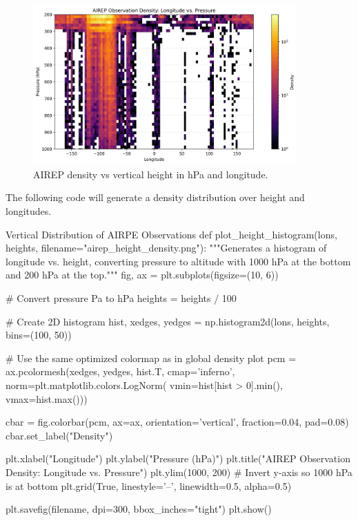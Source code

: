 \begin{figure}[ht]
    \centering
    \includegraphics[width=0.9\textwidth]{images/airep_height_density.png}
    \caption{AIREP density vs vertical height in hPa and longitude.}
    \label{fig:airep_plot}
\end{figure}

The following code will generate a density distribution over height and longitudes. 

\begin{codeonly}{Vertical Distribution of AIRPE Observations}
def plot_height_histogram(lons, heights,
                           filename="airep_height_density.png"):
    """Generates a histogram of longitude vs. height, converting pressure
    to altitude with 1000 hPa at the bottom and 200 hPa at the top."""
    fig, ax = plt.subplots(figsize=(10, 6))
    
    # Convert pressure Pa to hPa 
    heights = heights / 100 
    
    # Create 2D histogram
    hist, xedges, yedges = np.histogram2d(lons, heights,
                                          bins=(100, 50))
    
    # Use the same optimized colormap as in global density plot
    pcm = ax.pcolormesh(xedges, yedges, hist.T, cmap='inferno',
                        norm=plt.matplotlib.colors.LogNorm(
                            vmin=hist[hist > 0].min(),
                            vmax=hist.max()))
    
    cbar = fig.colorbar(pcm, ax=ax, orientation='vertical',
                        fraction=0.04, pad=0.08)
    cbar.set_label("Density")
    
    plt.xlabel("Longitude")
    plt.ylabel("Pressure (hPa)")
    plt.title("AIREP Observation Density: Longitude vs. Pressure")
    plt.ylim(1000, 200)  # Invert y-axis so 1000 hPa is at bottom
    plt.grid(True, linestyle='--', linewidth=0.5, alpha=0.5)
    
    plt.savefig(filename, dpi=300, bbox_inches="tight")
    plt.show()
\end{codeonly}



